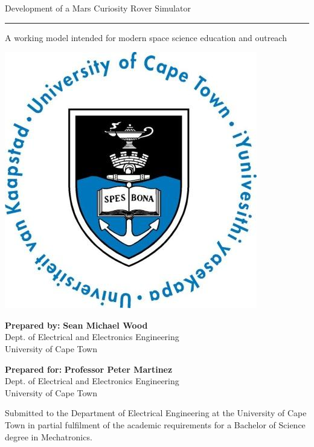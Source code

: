 


 
\thispagestyle{empty}
{\Huge \begin{center}

Development of a Mars Curiosity Rover Simulator
\vskip 5mm
\hrule 

{\Large A working model intended for modern space science education and outreach}
\end{center}}

\vskip 5mm
\begin{center}
\includegraphics[scale = 0.3]{uctLogo.png}
\end{center}

\vskip 5mm
\begin{center}
{\large
\textbf{Prepared by:}
\vskip 0.01mm
\textbf{\LARGE Sean Michael Wood}\\
Dept. of Electrical and Electronics Engineering\\University of Cape Town
}
\end{center}

\vskip 10mm
\begin{center}
{\large
\textbf{Prepared for:}
\vskip 0.01mm
\textbf{\LARGE Professor Peter Martinez}\\
Dept. of Electrical and Electronics Engineering\\University of Cape Town
}
\end{center}


\vskip 10mm
\begin{center}
Submitted to the Department of Electrical Engineering at the University of Cape Town in partial
fulfilment of the academic requirements for a Bachelor of Science degree in Mechatronics.

\end{center}


